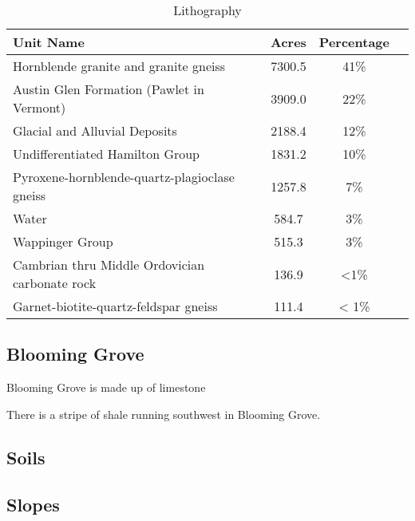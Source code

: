 \begin{table}[h!]
    \begin{tabular}{l c c c}
    Unit Name & Acres & Percentage \\
    \hline
    Hornblende granite and granite gneiss &	7300.5 & 41\%\\
    Austin Glen Formation (Pawlet in Vermont) &	3909.0 & 22\% \\
    Glacial and Alluvial Deposits &	2188.4 & 12\% \\
    Undifferentiated Hamilton Group & 1831.2 & 10\% \\
    Pyroxene-hornblende-quartz-plagioclase gneiss & 1257.8 & 7\%\\
    Water & 584.7 & 3\%\\
    Wappinger Group & 515.3 & 3\% \\
    Cambrian thru Middle Ordovician carbonate rock & 136.9 & <1\%\\
    Garnet-biotite-quartz-feldspar gneiss &	111.4 & < 1\%\\
    \end{tabular}
    \caption{Lithography}
    \label{tab:Cornwall_lith}
\end{table}

\subsection{Blooming Grove}
Blooming Grove is made up of 
limestone

There is a stripe of shale running southwest in Blooming Grove. 

\subsection{Soils}
\subsection{Slopes}